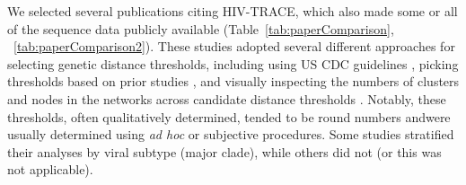 \documentclass[utf8]{FrontiersinHarvard} %
\begin{document}
We selected several publications citing HIV-TRACE, which also made  some or all of the sequence data publicly available (Table~\ref{tab:paperComparison}, ~\ref{tab:paperComparison2}). 
These studies adopted several different approaches for selecting genetic distance thresholds, including using US CDC guidelines \citep{yan_central_2020}, picking thresholds based on prior studies \citep{sivay_hiv-1_2018}, and visually inspecting the numbers of clusters and nodes in the networks across
candidate distance thresholds \citep{liu_dynamics_2020}. Notably, these
thresholds, often qualitatively determined, tended to be round numbers andwere usually determined using {\it ad hoc} or subjective procedures. 
Some studies stratified their analyses by viral subtype (major clade), while others did not (or this was not applicable).
\end{document}

